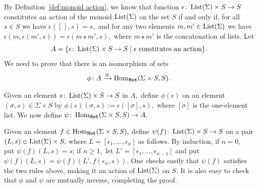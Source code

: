 \documentclass[../main/CT4S-EN-RU]{subfiles}
\begin{document}
\begin{proofENG}
By Definition~\ref{def:monoid action}, we know that function $\epsilon\colon\operatorname{List}(\Sigma)\times S\rightarrow S$ constitutes an action of the monoid $\operatorname{List}(\Sigma)$ on the set $S$ if and only if, for all $s\in S$ we have $\epsilon([\,],s)=s,$ and for any two elements $m,m'\in\operatorname{List}(\Sigma)$ we have $\epsilon(m,\epsilon(m',s))=\epsilon(m\star m',s),$ where $m\star m'$ is the concatenation of lists. Let $$A=\{\epsilon\colon \operatorname{List}(\Sigma)\times S\rightarrow S{\;|\;}\epsilon\textnormal{ constitutes an action}\}.$$ We need to prove that there is an isomorphism of sets $$\phi\colon A\xrightarrow{\cong}\operatorname{Hom}_{\mathbf{Set}}(\Sigma\times S,S).$$

Given an element $\epsilon\colon\operatorname{List}(\Sigma)\times S\rightarrow S$ in $A,$ define $\phi(\epsilon)$ on an element $(\sigma,s)\in\Sigma\times S$ by $\phi(\epsilon)(\sigma,s):=\epsilon([\sigma],s),$ where $[\sigma]$ is the one-element list. We now define $\psi\colon\operatorname{Hom}_{\mathbf{Set}}(\Sigma\times S,S)\rightarrow A.$

Given an element $f\in\operatorname{Hom}_{\mathbf{Set}}(\Sigma\times S,S),$ define $\psi(f)\colon\operatorname{List}(\Sigma)\times S\rightarrow S$ on a pair $(L,s)\in\operatorname{List}(\Sigma)\times S,$ where $L=[\epsilon_1,\ldots,\epsilon_n]$ as follows. By induction, if $n=0,$ put $\psi(f)(L,s)=s$; if $n\geq 1,$ let $L'=[\epsilon_1,\ldots,\epsilon_{n-1}]$ and put $\psi(f)(L,s)=\psi(f)(L',f(\epsilon_n,s)).$ One checks easily that $\psi(f)$ satisfies the two rules above, making it an action of $\operatorname{List}(\Sigma)$ on $S.$ It is also easy to check that $\phi$ and $\psi$ are mutually inverse, completing the proof.
\end{proofENG}
\end{document}
